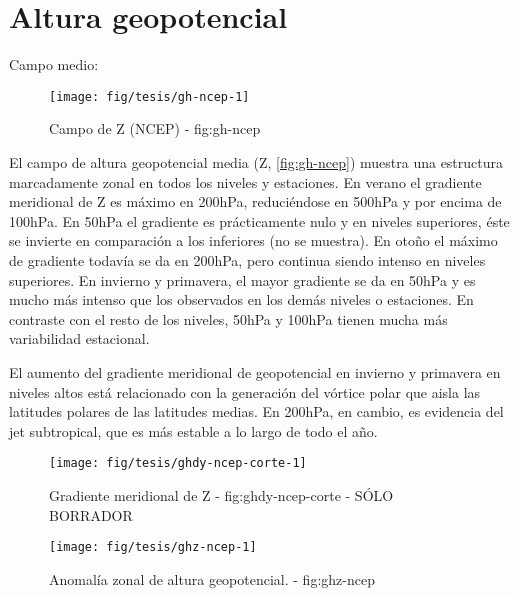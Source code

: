 \documentclass[spanish,a4paper]{book}
\begin{document}
\section{Altura geopotencial}\label{altura-geopotencial}

Campo medio:

\begin{landscape}\begin{figure}

{\centering \texttt{[image: fig/tesis/gh-ncep-1]} 

}

\caption{Campo de Z (NCEP) - fig:gh-ncep}\label{fig:gh-ncep}
\end{figure}
\end{landscape}

El campo de altura geopotencial media (Z, \autoref{fig:gh-ncep}) muestra
una estructura marcadamente zonal en todos los niveles y estaciones. En
verano el gradiente meridional de Z es máximo en 200hPa, reduciéndose en
500hPa y por encima de 100hPa. En 50hPa el gradiente es prácticamente
nulo y en niveles superiores, éste se invierte en comparación a los
inferiores (no se muestra). En otoño el máximo de gradiente todavía se
da en 200hPa, pero continua siendo intenso en niveles superiores. En
invierno y primavera, el mayor gradiente se da en 50hPa y es mucho más
intenso que los observados en los demás niveles o estaciones. En
contraste con el resto de los niveles, 50hPa y 100hPa tienen mucha más
variabilidad estacional.

El aumento del gradiente meridional de geopotencial en invierno y
primavera en niveles altos está relacionado con la generación del
vórtice polar que aisla las latitudes polares de las
latitudes medias. En 200hPa, en cambio, es evidencia del jet
subtropical, que es más estable a lo largo de todo el año.

\begin{figure*}
\texttt{[image: fig/tesis/ghdy-ncep-corte-1]} \caption{Gradiente meridional de Z - fig:ghdy-ncep-corte - SÓLO BORRADOR}\label{fig:ghdy-ncep-corte}
\end{figure*}

\begin{landscape}\begin{figure}

{\centering \texttt{[image: fig/tesis/ghz-ncep-1]} 

}

\caption{Anomalía zonal de altura geopotencial. - fig:ghz-ncep}\label{fig:ghz-ncep}
\end{figure}
\end{landscape}
\end{document}
